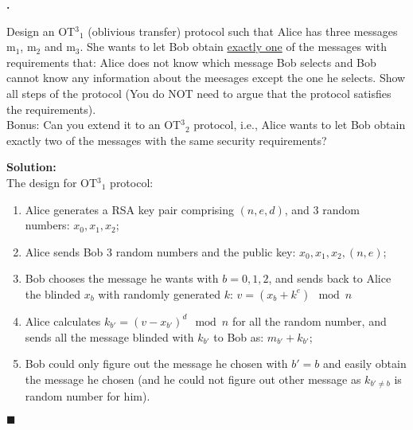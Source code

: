 \documentclass{article}
\newcounter{pcounter}                                   %
\newenvironment{problem}                                %
{                                                       %
    \color{gray}                                        %
    \stepcounter{pcounter}                              %
    \textbf{\arabic{pcounter}.}                         %
}{}                                                     %
\newenvironment{solution}                               %
{\textbf{Solution:} \\}{$\blacksquare$\newline}         %
\begin{document}
    \begin{problem}
        Design an OT${^3}_1$ (oblivious transfer) protocol such that Alice has three messages m$_1$, m$_2$ and m$_3$.
        She wants to let Bob obtain \underline{exactly one} of the messages with requirements that: Alice does not know which message Bob selects and Bob cannot know any information about the meesages except the one he selects.
        Show all steps of the protocol (You do NOT need to argue that the protocol satisfies the requirements).
        \\
        Bonus: Can you extend it to an OT${^3}_2$ protocol, i.e., Alice wants to let Bob obtain exactly two of the messages with the same security requirements?
    \end{problem}

    \begin{solution}
        The design for OT${^3}_1$ protocol:
        \begin{enumerate}
            \item Alice generates a RSA key pair comprising $(n, e, d)$, and 3 random numbers: $x_0, x_1, x_2$;
            \item Alice sends Bob 3 random numbers and the public key: $x_0, x_1, x_2, (n, e)$;
            \item Bob chooses the message he wants with $b=0,1,2$, and sends back to Alice the blinded $x_b$ with randomly generated $k$: $v = (x_b + k^e) \mod{n}$
            \item Alice calculates $k_{b'} = (v - x_{b'})^d \mod{n}$ for all the random number, and sends all the message blinded with $k_{b'}$ to Bob as: $m_{b'} + k_{b'}$;
            \item Bob could only figure out the message he chosen with $b' = b$ and easily obtain the message he chosen (and he could not figure out other message as $k_{b' \neq b}$ is random number for him).
        \end{enumerate}
    \end{solution}
\end{document}
